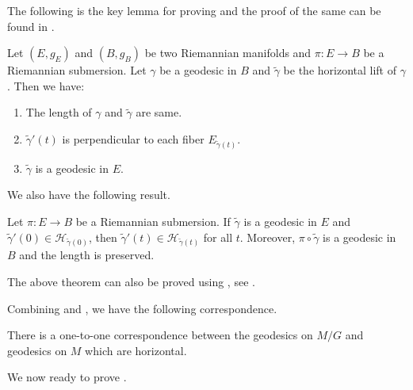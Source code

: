 \vspace{0.3cm}
\hf The following is the key lemma for proving  and the proof of the same can be found in \cite[Lemma 26.11]{Mic08}.

\begin{lemma}\label{lemma:horizontal-lift-is-a-geodesic}
	Let $\left(E,g_E\right)$ and $\left(B,g_B\right)$ be two Riemannian manifolds and $\pi:E\to B$ be a Riemannian submersion. Let $\gamma$ be a geodesic in $B$ and $\tilde{\gamma}$ be the horizontal lift of $\gamma$. Then we have:
	\begin{enumerate}
		\item The length of $\gamma$ and $\tilde{\gamma}$ are same.
		\item $\tilde{\gamma}'(t)$ is perpendicular to each fiber $E_{\tilde{\gamma}(t)}$.
		\item $\tilde{\gamma}$ is a geodesic in $E$.
	\end{enumerate}
\end{lemma}

\vspace{0.3cm}
\noindent We also have the following result.
\begin{thm}[O'Neill]\label{thm:O'Neill-theorem}
	Let $\pi:E\to B$ be a Riemannian submersion. If $\tilde{\gamma}$ is a geodesic in $E$ and $\tilde{\gamma}'(0)\in \mathcal{H}_{\tilde{\gamma}(0)}$, then $\tilde{\gamma}'(t)\in \mathcal{H}_{\tilde{\gamma}(t)}$ for all $t$. Moreover, $\pi\circ \tilde{\gamma}$ is a geodesic in $B$ and the length is preserved.
\end{thm}

\vspace{0.3cm}
\noindent The above theorem can also be proved using , see \cite[Corollary 26.12]{Mic08}.

\vspace{.3cm}

\noindent Combining  and , we have the following correspondence. 

\begin{thm}\label{thm:geodesic-correspondence}
	There is a one-to-one correspondence between the geodesics on $M/G$ and geodesics on $M$ which are horizontal.
\end{thm}

\vspace{.3cm}
\noindent We now ready to prove .

